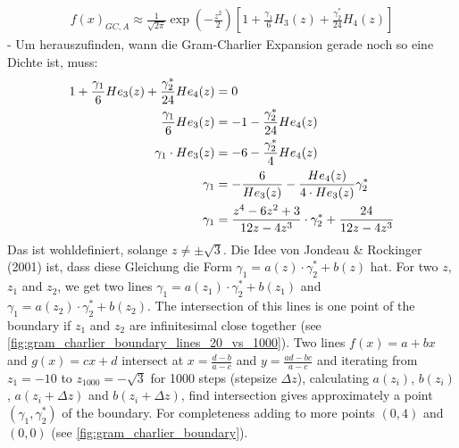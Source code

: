 \begin{align}
    \label{eq:gc_a_expansion_s_ek}
    f(x)_{GC,A} \approx \frac{1}{\sqrt{2\pi}}\exp\left(-\frac{z^2}{2}\right) \left[1 + \frac{\gamma_1}{6}H_3(z) + \frac{\gamma_2^*}{24}H_4(z)\right]
\end{align}
- Um herauszufinden, wann die Gram-Charlier Expansion gerade noch so eine Dichte ist, muss:
\begin{align}
    1 + \frac{\gamma_1}{6}He_3(z) + \frac{\gamma_2^*}{24}He_4(z) &= 0 \notag \\
    \frac{\gamma_1}{6}He_3(z) &= -1 - \frac{\gamma_2^*}{24}He_4(z) \notag \\
    \gamma_1\cdot He_3(z) &= -6 - \frac{\gamma_2^*}{4}He_4(z) \notag \\
    \gamma_1 &= -\frac{6}{He_3(z)} - \frac{He_4(z)}{4\cdot He_3(z)}\gamma_2^* \notag \\
    \gamma_1 &= \frac{z^4-6z^2+3}{12z-4z^3}\cdot \gamma_2^* + \frac{24}{12z-4z^3} \notag
\end{align}
Das ist wohldefiniert, solange $z\neq\pm\sqrt{3}$. Die Idee von Jondeau & Rockinger (2001) ist, dass diese Gleichung die Form $\gamma_1 = a(z)\cdot\gamma_2^* + b(z)$ hat. For two $z$, $z_1$ and $z_2$, we get two lines $\gamma_1 = a(z_1)\cdot \gamma_2^* + b(z_1)$ and $\gamma_1 = a(z_2)\cdot \gamma_2^* + b(z_2)$. The intersection of this lines is one point of the boundary if $z_1$ and $z_2$ are infinitesimal close together (see \ref{fig:gram_charlier_boundary_lines_20_vs_1000}). Two lines $f(x) = a+bx$ and $g(x) = cx+d$ intersect at $x = \frac{d-b}{a-c}$ and $y = \frac{ad-bc}{a-c}$ and iterating from $z_1=-10$ to $z_{1000}=-\sqrt{3}$ for 1000 steps (stepsize $\Delta z$), calculating $a(z_i)$, $b(z_i)$, $a(z_i+\Delta z)$ and $b(z_i+\Delta z)$, find intersection gives approximately a point $(\gamma_1, \gamma_2^*)$ of the boundary. For completeness adding to more points $(0,4)$ and $(0,0)$ (see \ref{fig:gram_charlier_boundary}).

